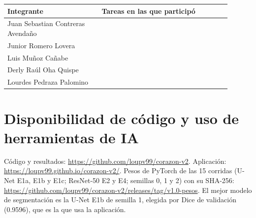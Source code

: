 \documentclass[conference]{IEEEtran}
\begin{document}
\begin{center}
\begin{tabular}{p{0.38\linewidth}p{0.52\linewidth}}
\toprule
Integrante & Tareas en las que participó \\
\midrule
Juan Sebastian Contreras Avendaño & \\
Junior Romero Lovera & \\
Luis Muñoz Cañabe & \\
Derly Raúl Oha Quispe & \\
Lourdes Pedraza Palomino & \\
\bottomrule
\end{tabular}
\end{center}

\section*{Disponibilidad de código y uso de herramientas de IA}

Código y resultados: \url{https://github.com/loupv99/corazon-v2}. Aplicación:
\url{https://loupv99.github.io/corazon-v2/}. Pesos de PyTorch de las 15 corridas (U-Net E1a, E1b y E1c; ResNet-50 E2
y E4; semillas 0, 1 y 2) con su SHA-256: \url{https://github.com/loupv99/corazon-v2/releases/tag/v1.0-pesos}. El
mejor modelo de segmentación es la U-Net E1b de semilla 1, elegida por Dice de validación (0.9596), que es la que usa
la aplicación.



\end{document}
